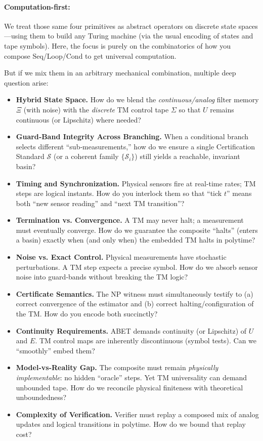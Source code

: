 \documentclass[12pt]{article}
\theoremstyle{definition}
\theoremstyle{plain}
\begin{document}
\paragraph{Computation-first:} We treat those same four primitives as abstract operators on discrete state spaces—using them to build any Turing machine (via the usual encoding of states and tape symbols).  Here, the focus is purely on the combinatorics of how you compose Seq/Loop/Cond to get universal computation.

But if we mix them in an arbitrary mechanical combination, multiple deep question arise:
\begin{itemize}
    \item \textbf{Hybrid State Space.} How do we blend the \textit{continuous/analog} filter memory $\Xi$ (with noise) with the \textit{discrete} TM control tape $\Sigma$ so that $U$ remains continuous (or Lipschitz) where needed?
    \item \textbf{Guard‑Band Integrity Across Branching.} When a conditional branch selects different “sub‑measurements,” how do we ensure a single Certification Standard $\mathcal S$ (or a coherent family $\{\mathcal S_i\}$) still yields a reachable, invariant basin?
    \item \textbf{Timing and Synchronization.} Physical sensors fire at real‑time rates; TM steps are logical instants. How do you interlock them so that “tick $t$” means both “new sensor reading” and “next TM transition”?
    \item \textbf{Termination vs. Convergence.} A TM may never halt; a measurement must eventually converge. How do we guarantee the composite “halts” (enters a basin) exactly when (and only when) the embedded TM halts in polytime?
    \item \textbf{Noise vs. Exact Control.} Physical measurements have stochastic perturbations. A TM step expects a precise symbol. How do we absorb sensor noise into guard‑bands without breaking the TM logic?
    \item \textbf{Certificate Semantics.} The NP witness must simultaneously testify to (a) correct convergence of the estimator and (b) correct halting/configuration of the TM. How do you encode both succinctly?
    \item \textbf{Continuity Requirements.} ABET demands continuity (or Lipschitz) of $U$ and $E$. TM control maps are inherently discontinuous (symbol tests). Can we “smoothly” embed them?
    \item \textbf{Model‐vs‐Reality Gap.} The composite must remain \textit{physically implementable}: no hidden “oracle” steps. Yet TM universality can demand unbounded tape. How do we reconcile physical finiteness with theoretical unboundedness?
    \item \textbf{Complexity of Verification.} Verifier must replay a composed mix of analog updates and logical transitions in polytime. How do we bound that replay cost?
\end{itemize}
\end{document}
